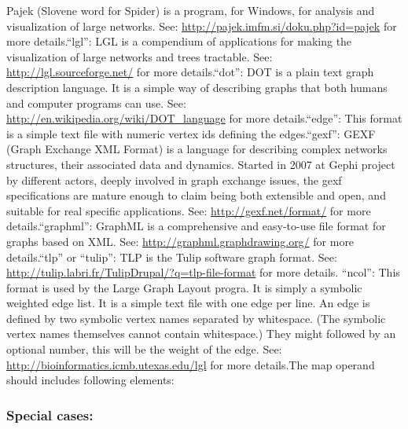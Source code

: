 \documentclass[]{book}
\theoremstyle{definition}
\theoremstyle{definition}
\theoremstyle{definition}
\theoremstyle{remark}
\begin{document}
Pajek (Slovene word for Spider) is a program, for Windows, for analysis
and visualization of large networks. See:
\url{http://pajek.imfm.si/doku.php?id=pajek} for more details.``lgl'':
LGL is a compendium of applications for making the visualization of
large networks and trees tractable. See:
\url{http://lgl.sourceforge.net/} for more details.``dot'': DOT is a
plain text graph description language. It is a simple way of describing
graphs that both humans and computer programs can use. See:
\url{http://en.wikipedia.org/wiki/DOT_language} for more
details.``edge'': This format is a simple text file with numeric vertex
ids defining the edges.``gexf'': GEXF (Graph Exchange XML Format) is a
language for describing complex networks structures, their associated
data and dynamics. Started in 2007 at Gephi project by different actors,
deeply involved in graph exchange issues, the gexf specifications are
mature enough to claim being both extensible and open, and suitable for
real specific applications. See: \url{http://gexf.net/format/} for more
details.``graphml'': GraphML is a comprehensive and easy-to-use file
format for graphs based on XML. See:
\url{http://graphml.graphdrawing.org/} for more details.``tlp'' or
``tulip'': TLP is the Tulip software graph format. See:
\url{http://tulip.labri.fr/TulipDrupal/?q=tlp-file-format} for more
details. ``ncol'': This format is used by the Large Graph Layout progra.
It is simply a symbolic weighted edge list. It is a simple text file
with one edge per line. An edge is defined by two symbolic vertex names
separated by whitespace. (The symbolic vertex names themselves cannot
contain whitespace.) They might followed by an optional number, this
will be the weight of the edge. See:
\url{http://bioinformatics.icmb.utexas.edu/lgl} for more details.The map
operand should includes following elements:

\subsubsection{Special cases:}\label{special-cases-91}
\end{document}
